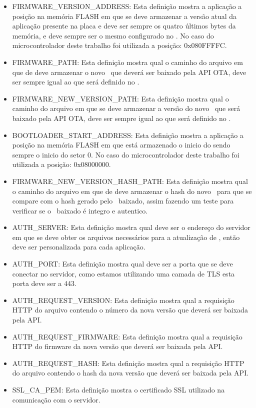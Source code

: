 \begin{itemize}
    \item FIRMWARE\_VERSION\_ADDRESS: Esta definição mostra a aplicação a posição na memória FLASH em que se deve armazenar a versão atual da aplicação presente na placa e deve ser sempre os quatro últimos bytes da memória, e deve sempre ser o mesmo configurado no \bootloader. No caso do microcontrolador deste trabalho foi utilizada a posição: 0x080FFFFC.
    \item FIRMWARE\_PATH: Esta definição mostra qual o caminho do arquivo em que de deve armazenar o novo \firmware\ que deverá ser baixado pela API OTA, deve ser sempre igual ao que será definido no \bootloader.
    \item FIRMWARE\_NEW\_VERSION\_PATH: Esta definição mostra qual o caminho do arquivo em que se deve armazenar a versão do novo \firmware\ que será baixado pela API OTA, deve ser sempre igual ao que será definido no \bootloader.
    \item BOOTLOADER\_START\_ADDRESS: Esta definição mostra a aplicação a posição na memória FLASH em que está armazenado o inicio do \bootloader sendo sempre o inicio do setor 0. No caso do microcontrolador deste trabalho foi utilizada a posição: 0x08000000.
    \item FIRMWARE\_NEW\_VERSION\_HASH\_PATH: Esta definição mostra qual o caminho do arquivo em que de deve armazenar o hash do novo \firmware\ para que se compare com o hash gerado pelo \firmware\ baixado, assim fazendo um teste para verificar se o \firmware\ baixado é integro e autentico.
    \item AUTH\_SERVER: Esta definição mostra qual deve ser o endereço do servidor em que se deve obter os arquivos necessários para a atualização de \firmware, então deve ser personalizada para cada aplicação.
    \item AUTH\_PORT: Esta definição mostra qual deve ser a porta que se deve conectar no servidor, como estamos utilizando uma camada de TLS esta porta deve ser a 443.
    \item AUTH\_REQUEST\_VERSION: Esta definição mostra qual a requisição HTTP do arquivo contendo o número da nova versão que deverá ser baixada pela API.
    \item AUTH\_REQUEST\_FIRMWARE: Esta definição mostra qual a requisição HTTP do firmware da nova versão que deverá ser baixada pela API.
    \item AUTH\_REQUEST\_HASH: Esta definição mostra qual a requisição HTTP do arquivo contendo o hash da nova versão que deverá ser baixada pela API.
    \item SSL\_CA\_PEM: Esta definição mostra o certificado SSL utilizado na comunicação com o servidor.
\end{itemize}

